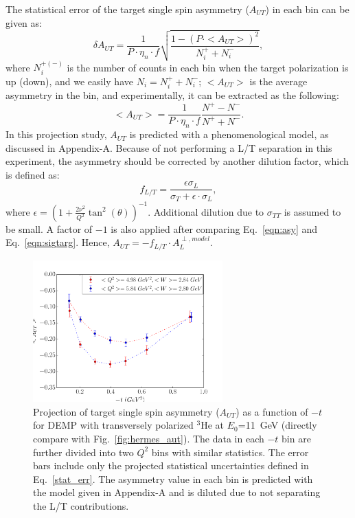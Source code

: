 The statistical error of the target single spin asymmetry ($A_{UT}$) in each
bin can be given as:
  \begin{equation}
    \delta A_{UT} = \frac{1}{P\cdot\eta_{n}\cdot f} \sqrt{\frac{1-(P\cdot
        <A_{UT}>)^{2}}{N^{+}_{i}+N^{-}_{i}}},
    \label{stat_err}
 \end{equation}
where $N^{+(-)}_{i}$ is the number of counts in each bin when the target
polarization is up (down), and we easily have $N_{i}=N^{+}_{i}+N^{-}_{i}$;
$<A_{UT}>$ is the average asymmetry in the bin, and experimentally, it can be
extracted as the following:
\begin{equation}
   <A_{UT}> = \frac{1}{P\cdot\eta_{n}\cdot f} \frac{N^{+}-N^{-}}{N^{+}+N^{-}}.
   \label{asym_exp}
\end{equation}
In this projection study, $A_{UT}$ is predicted with a phenomenological model,
as discussed in Appendix-A. Because of not performing a L/T separation in this
experiment, the asymmetry should be corrected by another dilution factor, which
is defined as:
\begin{equation}
  f_{L/T} =\frac{\epsilon\sigma_{L} }{\sigma_{T}+\epsilon\cdot\sigma_{L} },
\end{equation} 
where $\epsilon=(1+\frac{2\nu^{2}}{Q^{2}}\tan^{2}(\theta))^{-1}$. Additional
dilution due to $\sigma_{TT}$ is assumed to be small.  A factor of $-1$ is also
applied after comparing Eq.~\ref{eqn:asy} and Eq.~\ref{eqn:sigtarg}. Hence,
$A_{UT} = -f_{L/T}\cdot A_{L}^{\perp,model}$.

\begin{figure}[!ht]
 \begin{center}
               \includegraphics[type=pdf,
        ext=.pdf,read=.pdf,width=0.65\textwidth]{./figures/bin_asym_t_fermi_02Hz} 
      
      \caption{\footnotesize{Projection of target single spin asymmetry
          ($A_{UT}$) as a function of $-t$ for DEMP with transversely polarized
$\mathrm{^{3}He}$ at $E_{0}$=11~GeV (directly compare with
Fig.~\ref{fig:hermes_aut}).  The data in each $-t$ bin are further divided into
two $Q^{2}$ bins with similar statistics.  The error bars include only the
projected statistical uncertainties defined in Eq.~\ref{stat_err}. The
asymmetry value in each bin is predicted with the model given in Appendix-A and
is diluted due to not separating the L/T contributions.}}
  \label{asym_t}
  \end{center}
\end{figure}

